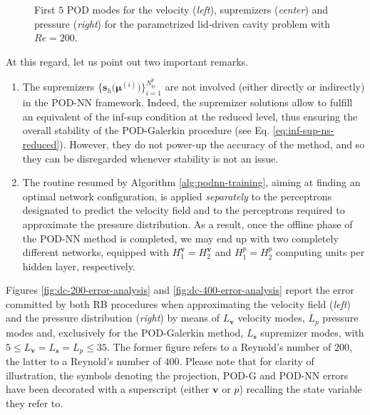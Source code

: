 \documentclass[12pt, a4paper, twoside, openright, notitlepage]{report}
\numberwithin{equation}{chapter}
\theoremstyle{theorem}
\theoremstyle{definition}
\theoremstyle{remark}
\theoremstyle{proposition}
\numberwithin{figure}{chapter}
\newcommand{\bg}[1]{\boldsymbol{#1}}
\begin{document}
\begin{figure}[H]
			
			\caption{First $5$ POD modes for the velocity (\emph{left}), supremizers (\emph{center}) and pressure (\emph{right}) for the parametrized lid-driven cavity problem with $Re = 200$.}
			\label{fig:dc-modal-functions}
		\end{figure}
		
		\noindent At this regard, let us point out two important remarks.
		\begin{enumerate}[label=(\roman*)]
			\item The supremizers $\big\lbrace \mathbf{s}_h \big( \bg{\mu}^{(i)} \big) \big\rbrace_{i = 1}^{N_{tr}^p}$ are not involved (either directly or indirectly) in the POD-NN framework. Indeed, the supremizer solutions allow to fulfill an equivalent of the inf-sup condition at the reduced level, thus ensuring the overall stability of the POD-Galerkin procedure (see Eq. \eqref{eq:inf-sup-ns-reduced}). However, they do not power-up the accuracy of the method, and so they can be disregarded whenever stability is not an issue.
			\item The routine resumed by Algorithm \ref{alg:podnn-training}, aiming at finding an optimal network configuration, is applied \emph{separately} to the perceptrons designated to predict the velocity field and to the perceptrons required to approximate the pressure distribution. As a result, once the offline phase of the POD-NN method is completed, we may end up with two completely different networks, equipped with $H_1^{\bg{v}} = H_2^{\bg{v}}$ and $H_1^p = H_2^p$ computing units per hidden layer, respectively.  
		\end{enumerate}
		Figures \ref{fig:dc-200-error-analysis} and \ref{fig:dc-400-error-analysis} report the error committed by both RB procedures when approximating the velocity field (\emph{left}) and the pressure distribution (\emph{right}) by means of $L_{\bg{v}}$ velocity modes, $L_p$ pressure modes and, exclusively for the POD-Galerkin method, $L_{\bg{s}}$ supremizer modes, with $5 \leq L_{\bg{v}} = L_{\bg{s}} = L_p \leq 35$. The former figure refers to a Reynold's number of $200$, the latter to a Reynold's number of $400$. Please note that for clarity of illustration, the symbols denoting the projection, POD-G and POD-NN errors have been decorated with a superscript (either $\bg{v}$ or $p$) recalling the state variable they refer to. 
						
\end{document}
